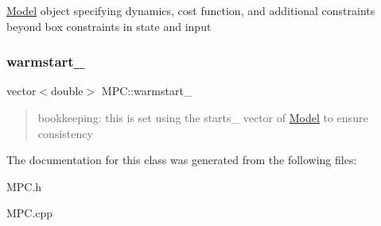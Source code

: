 \mbox{\hyperlink{classModel}{Model}} object specifying dynamics, cost function, and additional constraints beyond box constraints in state and input \mbox{\label{classMPC_a89874cd77d24cc8c7294c6643931e064}} 
\subsubsection{\texorpdfstring{warmstart\+\_\+}{warmstart\_}}
{\footnotesize\ttfamily vector$<$double$>$ M\+P\+C\+::warmstart\+\_\+\hspace{0.3cm}{\ttfamily [protected]}}

\begin{quote}
bookkeeping\+: this is set using the starts\+\_\+ vector of \mbox{\hyperlink{classModel}{Model}} to ensure consistency \end{quote}


The documentation for this class was generated from the following files\+:\begin{DoxyCompactItemize}
\item 
M\+P\+C.\+h\item 
M\+P\+C.\+cpp\end{DoxyCompactItemize}
